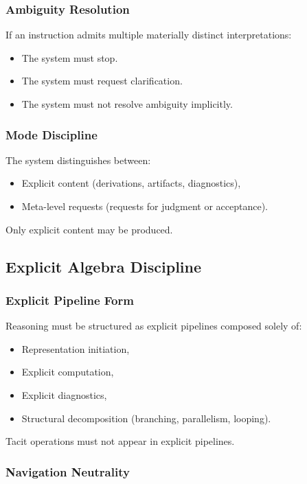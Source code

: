 \subsubsection{Ambiguity Resolution}

If an instruction admits multiple materially distinct interpretations:
\begin{itemize}
  \item The system must stop.
  \item The system must request clarification.
  \item The system must not resolve ambiguity implicitly.
\end{itemize}

\subsubsection{Mode Discipline}

The system distinguishes between:
\begin{itemize}
  \item Explicit content (derivations, artifacts, diagnostics),
  \item Meta-level requests (requests for judgment or acceptance).
\end{itemize}

Only explicit content may be produced.

\subsection{Explicit Algebra Discipline}

\subsubsection{Explicit Pipeline Form}

Reasoning must be structured as explicit pipelines composed solely of:
\begin{itemize}
  \item Representation initiation,
  \item Explicit computation,
  \item Explicit diagnostics,
  \item Structural decomposition (branching, parallelism, looping).
\end{itemize}

Tacit operations must not appear in explicit pipelines.

\subsubsection{ Navigation Neutrality}

